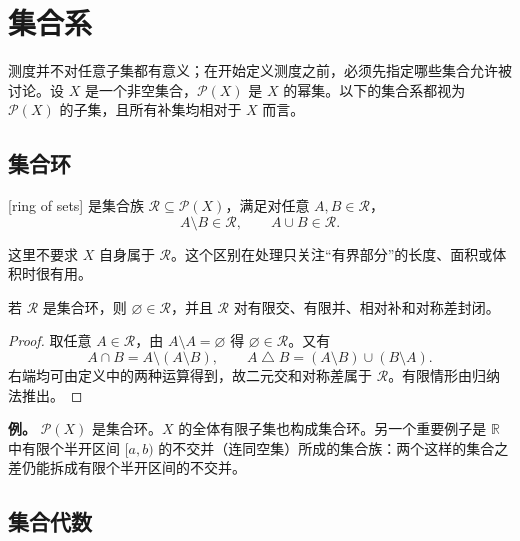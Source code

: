 \section{集合系}
\label{b1:sec:0101}

测度并不对任意子集都有意义；在开始定义测度之前，必须先指定哪些集合允许被讨论。设 \(X\) 是一个非空集合，\(\mathcal P(X)\) 是 \(X\) 的幂集。以下的集合系都视为 \(\mathcal P(X)\) 的子集，且所有补集均相对于 \(X\) 而言。

\subsection{集合环}
\label{b1:subsec:010101}

\begin{definition}
\label{b1:def:set-ring}
[ring of sets] 是集合族 \(\mathcal R\subseteq\mathcal P(X)\)，满足对任意 \(A,B\in\mathcal R\)，
\[
A\setminus B\in\mathcal R,
\qquad
A\cup B\in\mathcal R.
\]
\end{definition}

这里不要求 \(X\) 自身属于 \(\mathcal R\)。这个区别在处理只关注“有界部分”的长度、面积或体积时很有用。

\begin{proposition}
\label{b1:prop:ring-closure}
若 \(\mathcal R\) 是集合环，则 \(\varnothing\in\mathcal R\)，并且 \(\mathcal R\) 对有限交、有限并、相对补和对称差封闭。
\end{proposition}
\begin{proof}
取任意 \(A\in\mathcal R\)，由 \(A\setminus A=\varnothing\) 得 \(\varnothing\in\mathcal R\)。又有
\[
A\cap B=A\setminus(A\setminus B),
\qquad
A\mathbin{\triangle}B=(A\setminus B)\cup(B\setminus A).
\]
右端均可由定义中的两种运算得到，故二元交和对称差属于 \(\mathcal R\)。有限情形由归纳法推出。
\end{proof}

\begin{remark}
\label{b1:rem:set-rings}
\textbf{例。} \(\mathcal P(X)\) 是集合环。\(X\) 的全体有限子集也构成集合环。另一个重要例子是 \(\mathbb R\) 中有限个半开区间 \([a,b)\) 的不交并（连同空集）所成的集合族：两个这样的集合之差仍能拆成有限个半开区间的不交并。
\end{remark}

\subsection{集合代数}
\label{b1:subsec:010102}

